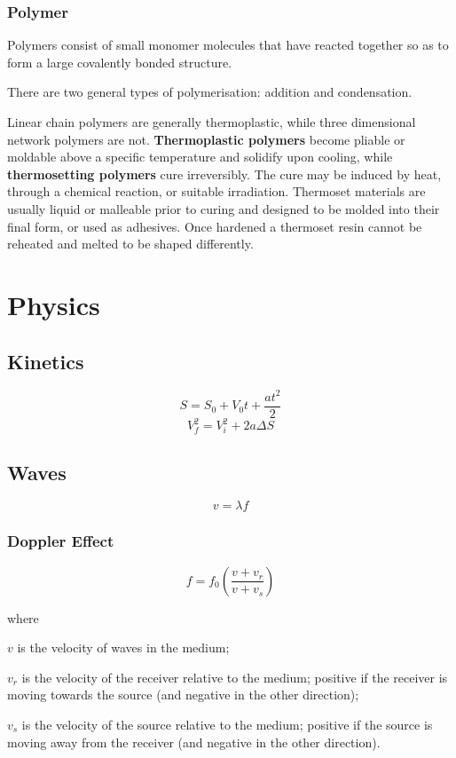 \documentclass[oneside]{book} %
\theoremstyle{plain}
\begin{document}
\section{Polymer}
Polymers consist of small monomer molecules that have reacted together so as to
form a large covalently bonded structure.

There are two general types of polymerisation: addition and condensation.

Linear chain polymers are generally thermoplastic, while three dimensional
network polymers are not. \textbf{Thermoplastic polymers} become pliable or
moldable above a specific temperature and solidify upon cooling, while
\textbf{thermosetting polymers} cure irreversibly. The cure may be induced by
heat, through a chemical reaction, or suitable irradiation. Thermoset materials
are usually liquid or malleable prior to curing and designed to be molded into
their final form, or used as adhesives. Once hardened a thermoset resin cannot
be reheated and melted to be shaped differently.

\part{Physics}

\chapter{Kinetics}
\[S = S_0 + V_0 t + \frac{a t^2}{2}\]
\[V_f^2 = V_i^2 + 2 a \Delta S\]

\chapter{Waves}
\[v = \lambda f\]

\section{Doppler Effect}
\[f = f_0 \left ( \frac{v + v_r}{v + v_s} \right )\]

where

\(v\) is the velocity of waves in the medium;

\(v_r\) is the velocity of the receiver relative to the medium; positive if the
receiver is moving towards the source (and negative in the other direction);

\(v_s\) is the velocity of the source relative to the medium; positive if the
source is moving away from the receiver (and negative in the other direction).
\end{document}
